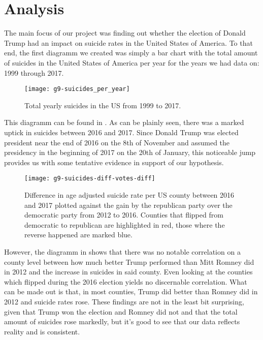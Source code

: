 \section{Analysis}

The main focus of our project was finding out whether the election of Donald Trump had an impact on suicide rates in the United States of America.
To that end, the first diagramm we created was simply a bar chart with the total amount of suicides in the United States of America per year for the years we had data on: 1999 through 2017.

\begin{figure}[tb]
\centering
\texttt{[image: g9-suicides\_per\_year]}
\caption{Total yearly suicides in the US from 1999 to 2017.}
\label{fig:yearly_suicides}
\end{figure}

This diagramm can be found in . As can be plainly seen, there was a marked uptick in suicides between 2016 and 2017.
Since Donald Trump was elected president near the end of 2016 on the 8th of November and assumed the presidency in the beginning of 2017 on the 20th of January, this noticeable jump provides us with some tentative evidence in support of our hypothesis.
\par

\begin{figure}[tb]
\centering
\texttt{[image: g9-suicides-diff-votes-diff]}
\caption{Difference in age adjusted suicide rate per US county between 2016 and 2017 plotted against the gain by the republican party over the democratic party from 2012 to 2016. Counties that flipped from democratic to republican are highlighted in red, those where the reverse happened are marked blue.}
\label{fig:suicides-diff-votes-diff}
\end{figure}

However, the diagramm in  shows that there was no notable correlation on a county level between how much better Trump performed than Mitt Romney did in 2012 and the increase in suicides in said county.
Even looking at the counties which flipped during the 2016 election yields no discernable correlation.
What can be made out is that, in most counties, Trump did better than Romney did in 2012 and suicide rates rose.
These findings are not in the least bit surprising, given that Trump won the election and Romney did not and that the total amount of suicides rose markedly, but it's good to see that our data reflects reality and is consistent.

